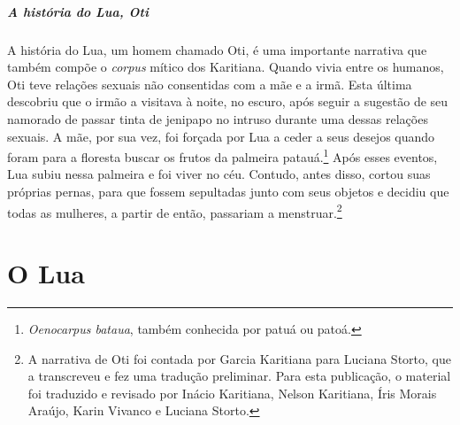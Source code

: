 \paragraph{A história do Lua, Oti} A história do Lua, um homem chamado Oti, é uma importante narrativa que também compõe o \textit{corpus} mítico dos Karitiana. Quando vivia entre
os humanos, Oti teve relações sexuais não consentidas com a mãe e a
irmã. Esta última descobriu que o irmão a visitava à noite, no escuro,
após seguir a sugestão de seu namorado de passar tinta de jenipapo no
intruso durante uma dessas relações sexuais. A mãe, por sua vez, foi
forçada por Lua a ceder a seus desejos quando foram para a floresta
buscar os frutos da palmeira patauá.\footnote{\textit{Oenocarpus bataua}, também 
conhecida por patuá ou patoá.} Após esses eventos, Lua subiu
nessa palmeira e foi viver no céu. Contudo, antes disso, cortou suas
próprias pernas, para que fossem sepultadas junto com seus objetos e
decidiu que todas as mulheres, a partir de então, passariam a menstruar.\footnote{A narrativa de Oti foi contada por Garcia Karitiana para Luciana Storto,
que a transcreveu e fez uma tradução preliminar. Para esta publicação, o
material foi traduzido e revisado por Inácio Karitiana, Nelson
Karitiana, Íris Morais Araújo, Karin Vivanco e Luciana Storto.}
\vspace*{\fill}


\chapter*{O Lua}

